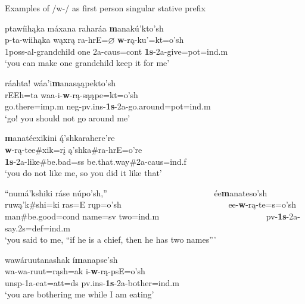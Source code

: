 \begin{exe}

\item\label{ExwPrefixStative} Examples of /w-/ as first person singular stative prefix

	\begin{xlist}
	
	\item \glll ptawíihąka máxana raharáa \textbf{m}anakú'kto'sh\\
	p-ta-wiihąka wąxrą ra-hrE=$\varnothing$ \textbf{w}-rą-ku'=kt=o'sh\\
	1poss-al-\textnormal{grandchild} \textnormal{one} 2a-caus=cont \textbf{1s}-2a-\textnormal{give}=pot=ind.m\\
	\glt `you can make one grandchild keep it for me' \citep[61]{hollow1973a}
	
	\item \glll ráahta! wáa'i\textbf{m}anasąąpekto'sh\\
	rEEh=ta waa-i-\textbf{w}-rą-sąąpe=kt=o'sh\\
	\textnormal{go.there}=imp.m neg-pv.ins-\textbf{1s}-2a-\textnormal{go.around}=pot=ind.m\\
	\glt `go! you should not go around me' \citep[147]{hollow1973a}
	
	\item \glll \textbf{m}anatéexikini ą́'shkarahere're\\
	\textbf{w}-rą-tee\#xik=rį ą'shka\#ra-hrE=o're\\
	\textbf{1s}-2a-\textnormal{like}\#\textnormal{be.bad}=ss \textnormal{be.that.way}\#2a-caus=ind.f\\
	\glt `you do not like me, so you did it like that' \citep[71]{hollow1973a}
	
	\item \glll ``numá'kshiki ráse núpo'sh,'' ~ ~ ~ ~ ~ ~ ~ ~ ~ ~ ~ ~ ~ ~ ~ ée\textbf{m}anateso'sh\\
	ruwą'k\#shi=ki ras=E rųp=o'sh ~ ~ ~ ~ ~ ~ ~ ~ ~ ~ ~ ~ ~ ~ ~ ee-\textbf{w}-rą-te=s=o'sh\\
	\textnormal{man}\#\textnormal{be.good}=cond \textnormal{name}=sv \textnormal{two}=ind.m ~ ~ ~ ~ ~ ~ ~ ~ ~ ~ ~ ~ ~ ~ ~ pv-\textbf{1s}-2a-\textnormal{say}.2s=def=ind.m\\
	\glt `you said to me, ``if he is a chief, then he has two names{''}' \citep[57]{hollow1973b}
	
	\item \glll wawáruutanashak í\textbf{m}anapse'sh\\
	wa-wa-ruut=rąsh=ak i-\textbf{w}-rą-psE=o'sh\\
	unsp-1a-\textnormal{eat}=att=ds pv.ins-\textbf{1s}-2a-\textnormal{bother}=ind.m\\
	\glt `you are bothering me while I am eating' \citep[133]{hollow1973b}
	

\end{xlist}
\end{exe}

